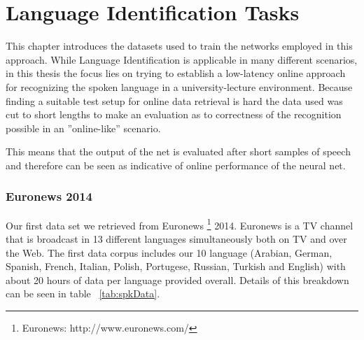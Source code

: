 



\chapter{Language Identification Tasks}
\label{ch:LITasks}
This chapter introduces the datasets used to train the networks employed in this approach. While Language Identification is applicable in many different scenarios, in this thesis the focus lies on trying to establish a low-latency online approach for recognizing the spoken language in a university-lecture environment. Because finding a suitable test setup for online data retrieval is hard the data used was cut to short lengths to make an evaluation as to correctness of the recognition possible in an ''online-like'' scenario. 

This means that the output of the net is evaluated after short samples of speech and therefore can be seen as indicative of online performance of the neural net.

\subsection{Euronews 2014}
\label{sec:LITasks:Euronews}
Our first data set we retrieved from Euronews \footnote{Euronews: http://www.euronews.com/} 2014. Euronews is a TV channel that is broadcast in 13 different languages simultaneously both on TV and over the Web. The first data corpus includes our 10 language (Arabian, German, Spanish, French, Italian, Polish, Portugese, Russian, Turkish and English)  with about 20 hours of data per language provided overall. Details of this breakdown can be seen in table ~\ref{tab:spkData}.


